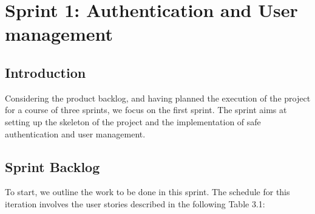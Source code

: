 \chapter{Sprint 1: Authentication and User management}



\section*{Introduction}


Considering the product backlog, and having planned the execution of the project for a course of three sprints, we focus on the first sprint. The sprint aims at setting up the skeleton of the project and the implementation of safe authentication and user management.

\section{Sprint Backlog}
To start, we outline the work to be done in this sprint. The schedule for this iteration
involves the user stories described in the following Table 3.1:

